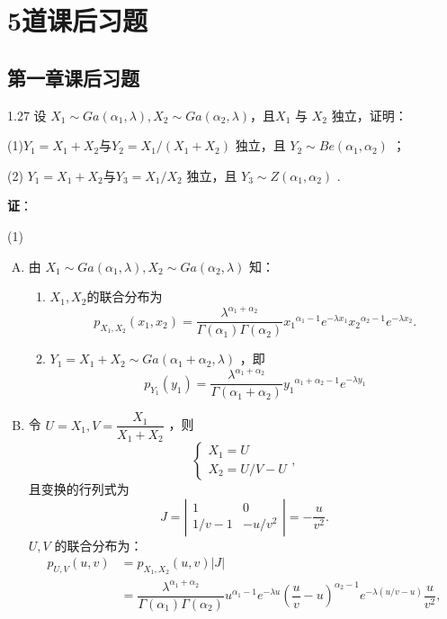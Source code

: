 \chapter{5道课后习题}
\section{第一章课后习题}
\begin{example}
    1.27 设 $X_1 \sim Ga(\alpha_1,\lambda),X_2\sim Ga(\alpha_2,\lambda) $，且$ X_1$ 与 $X_2$ 独立，证明：

    (1)$ Y_1=X_1+X_2 与 Y_2=X_1/(X_1+X_2)$ 独立，且 $Y_2 \sim Be(\alpha_1,\alpha_2)$ ；

    (2) $Y_1=X_1+X_2 与 Y_3=X_1/X_2$ 独立，且 $Y_3 \sim Z(\alpha_1,\alpha_2)$ .
    
    \textbf{证}：

    (1)
    \begin{enumerate}[A.]
        \item 由 $X_1 \sim Ga(\alpha_1,\lambda),X_2\sim Ga(\alpha_2,\lambda)$ 知：
        \begin{enumerate}[a]
            \item $X_1,X_2 $的联合分布为 
            \[
                p_{X_1,X_2}(x_1,x_2)=\dfrac{\lambda^{\alpha_1+\alpha_2}}{\Gamma(\alpha_1)\Gamma(\alpha_2)}{x_1}^{\alpha_1-1}e^{-\lambda x_1}{x_2}^{\alpha_2-1}e^{-\lambda x_2}.
            \]
            \item $Y_1=X_1+X_2 \sim Ga(\alpha_1+\alpha_2,\lambda)$ ，即 
            \[
                p_{Y_1}(y_1)=\dfrac{\lambda^{\alpha_1+\alpha_2}}{\Gamma(\alpha_1+\alpha_2)}{y_1}^{\alpha_1+\alpha_2-1}e^{-\lambda y_1}
            \]
        \end{enumerate}
        \item 令 $U=X_1,V=\dfrac{X_1}{X_1+X_2}$ ，则 
        \[
            \left\{ \begin{array}{ll} X_{1}=U \\ X_{2}=U/V-U \end{array}\right.,
        \]
        且变换的行列式为 
        \[
            J= \left | \begin{array}{ccc} 1 & 0 \\ 1/v-1 & -u/v^2 \end{array} \right |=-\dfrac{u}{v^2}.
        \]
        $U,V$ 的联合分布为： 
        \[
            \begin{aligned} p_{U,V}(u,v)&=p_{X_1,X_2}(u,v)|J| \\ &=\dfrac{\lambda^{\alpha_1+\alpha_2}}{\Gamma(\alpha_1)\Gamma(\alpha_2)}u^{\alpha_1-1}e^{-\lambda u}(\dfrac{u}{v}-u)^{\alpha_2-1}e^{-\lambda (u/v-u) }\dfrac{u}{v^2}, \end{aligned}
        \]
        

\end{enumerate}
\end{example}

